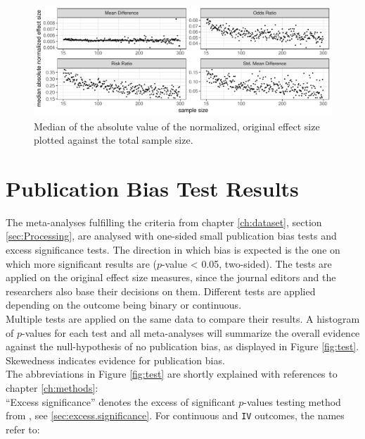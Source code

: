 \documentclass[11pt,a4paper,twoside]{book}\usepackage[]{graphicx}\usepackage[]{color}
\newenvironment{knitrout}{}{} %
\begin{document}
\begin{figure}
\begin{knitrout}
\color{fgcolor}

{\centering \includegraphics[width=\textwidth-3cm]{figure/ch03_figunnamed-chunk-12-1} 

}



\end{knitrout}
\caption{Median of the absolute value of the normalized, original effect size plotted against the total sample size.}
\label{effect.samplesize.separated}
\end{figure}



\section{Publication Bias Test Results} \label{sec:publication.bias.tests}




The meta-analyses fulfilling the criteria from chapter \ref{ch:dataset}, section \ref{sec:Processing}, are analysed with one-sided small publication bias tests and excess significance tests. The direction in which bias is expected is the one on which more significant results are ($p$-value < 0.05, two-sided). The tests are applied on the original effect size measures, since the journal editors and the researchers also base their decisions on them. Different tests are applied depending on the outcome being binary or continuous.\\
Multiple tests are applied on the same data to compare their results. A histogram of $p$-values for each test and all meta-analyses will summarize the overall evidence against the null-hypothesis of no publication bias, as displayed in Figure \ref{fig:test}. Skewedness indicates evidence for publication bias.\\
The abbreviations in Figure \ref{fig:test}  are shortly explained with references to chapter \ref{ch:methods}: \\
``Excess significance'' denotes the excess of significant $p$-values testing method from \citet{excess.significance}, see \ref{sec:excess.significance}. For continuous and \texttt{IV} outcomes, the names refer to: 
\end{document}
